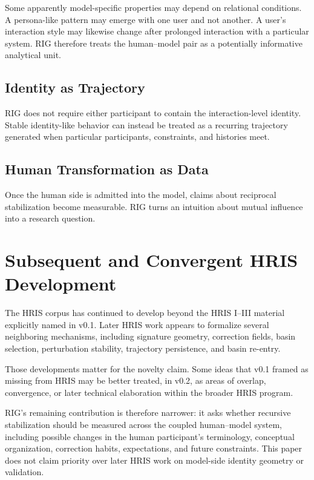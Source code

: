 \documentclass[12pt]{article}
\begin{document}
Some apparently model-specific properties may depend on relational conditions. A persona-like pattern may emerge with one user and not another. A user's interaction style may likewise change after prolonged interaction with a particular system. RIG therefore treats the human--model pair as a potentially informative analytical unit.

\subsection{Identity as Trajectory}

RIG does not require either participant to contain the interaction-level identity. Stable identity-like behavior can instead be treated as a recurring trajectory generated when particular participants, constraints, and histories meet.

\subsection{Human Transformation as Data}

Once the human side is admitted into the model, claims about reciprocal stabilization become measurable. RIG turns an intuition about mutual influence into a research question.

\section{Subsequent and Convergent HRIS Development}

The HRIS corpus has continued to develop beyond the HRIS I--III material explicitly named in v0.1. Later HRIS work appears to formalize several neighboring mechanisms, including signature geometry, correction fields, basin selection, perturbation stability, trajectory persistence, and basin re-entry.

Those developments matter for the novelty claim. Some ideas that v0.1 framed as missing from HRIS may be better treated, in v0.2, as areas of overlap, convergence, or later technical elaboration within the broader HRIS program.

RIG's remaining contribution is therefore narrower: it asks whether recursive stabilization should be measured across the coupled human--model system, including possible changes in the human participant's terminology, conceptual organization, correction habits, expectations, and future constraints. This paper does not claim priority over later HRIS work on model-side identity geometry or validation.
\end{document}
